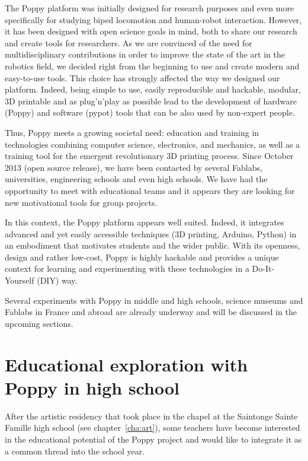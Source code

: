 The Poppy platform was initially designed for research purposes and even more specifically for studying biped locomotion and human-robot interaction. However, it has been designed with open science goals in mind, both to share our research and create tools for researchers. As we are convinced of the need for multidisciplinary contributions in order to improve the state of the art in the robotics field, we decided right from the beginning to use and create modern and easy-to-use tools. This choice has strongly affected the way we designed our platform. Indeed, being simple to use, easily reproducible and hackable, modular, 3D printable and as plug'n'play as possible lead to the development of hardware (Poppy) and software (pypot) tools that can be also used by non-expert people.

Thus, Poppy meets a growing societal need: education and training in technologies combining computer science, electronics, and mechanics, as well as a training tool for the emergent revolutionary 3D printing process. Since October 2013 (open source release), we have been contacted by several Fablabs, universities, engineering schools and even high schools. We have had the opportunity to meet with educational teams and it appears they are looking for new motivational tools for group projects.

In this context, the Poppy platform appears well suited. Indeed, it integrates advanced and yet easily accessible techniques (3D printing, Arduino, Python) in an embodiment that motivates students and the wider public. With its openness, design and rather low-cost, Poppy is highly hackable and provides a unique context for learning and experimenting with these technologies in a Do-It-Yourself (DIY) way.

Several experiments with Poppy in middle and high schools, science museums and Fablabs in France and abroad are already underway and will be discussed in the upcoming sections.


\section{Educational exploration with Poppy in high school} %

After the artistic residency that took place in the chapel at the Saintonge Sainte Famille high school (see chapter~\ref{cha:art}), some teachers have become interested in the educational potential of the Poppy project and would like to integrate it as a common thread into the school year.

